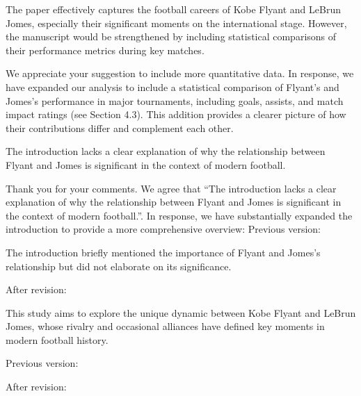 \reviewer
\begin{generalcomment}
The paper effectively captures the football careers of Kobe Flyant and LeBrun Jomes, especially their significant moments on the international stage. However, the manuscript would be strengthened by including statistical comparisons of their performance metrics during key matches.

\end{generalcomment}
\begin{revmeta}
	We appreciate your suggestion to include more quantitative data. In response, we have expanded our analysis to include a statistical comparison of Flyant's and Jomes's performance in major tournaments, including goals, assists, and match impact ratings (see Section 4.3). This addition provides a clearer picture of how their contributions differ and complement each other.
	
\end{revmeta}

\begin{revcomment}
	The introduction lacks a clear explanation of why the relationship between Flyant and Jomes is significant in the context of modern football.
\end{revcomment}

\begin{revresponse}
		
	Thank you for your comments. We agree that “The introduction lacks a clear explanation of why the relationship between Flyant and Jomes is significant in the context of modern football.”. In response, we have substantially expanded the introduction to provide a more comprehensive overview:
	Previous version:
	\begin{previous}
		The introduction briefly mentioned the importance of Flyant and Jomes's relationship but did not elaborate on its significance.
	\end{previous}
	
	After revision: 
	\begin{changes}
		 This study aims to explore the unique dynamic between Kobe Flyant and LeBrun Jomes, whose rivalry and occasional alliances have defined key moments in modern football history.
	\end{changes}	
	
\end{revresponse}

\begin{revcomment}
	
\end{revcomment}

\begin{revresponse}
	
	Previous version:
	\begin{previous}
	
	\end{previous}
	After revision: 
	\begin{changes}
		
	\end{changes}	
\end{revresponse}